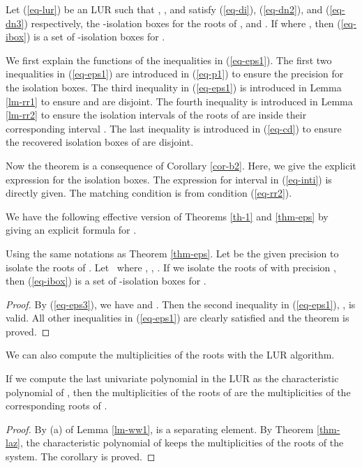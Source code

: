 \documentclass[amsthm]{JSC_LaTex_2007_Mar_12/elsart}
\def\bref#1{(\ref{#1})}
\begin{document}
\begin{thm}\label{thm-eps}
Let \bref{eq-lur} be an LUR such that , , and 
satisfy \bref{eq-di}, \bref{eq-dn2}, and \bref{eq-dn3} respectively,
 the -isolation boxes for the roots of
, and . If
 where ,
 then \bref{eq-ibox} is a set of -isolation boxes  for .
\end{thm}
\begin{pf}
We  first explain the functions of the inequalities in
\bref{eq-eps1}.
The first two inequalities in \bref{eq-eps1} are introduced in
\bref{eq-p1} to ensure the  precision for the isolation
boxes.
The third inequality in \bref{eq-eps1} is introduced in Lemma
\ref{lm-rr1} to ensure  and
 are disjoint.
The fourth inequality is introduced in Lemma \ref{lm-rr2} to ensure
the isolation intervals of the roots of  are inside
their corresponding interval .
The last inequality is introduced in \bref{eq-cd} to ensure the
recovered isolation boxes of  are disjoint.

Now the theorem is a consequence of Corollary \ref{cor-b2}. Here, we
give the explicit expression for the isolation boxes. The expression
for interval  in \bref{eq-inti} is directly given. The
matching condition  is from
condition \bref{eq-rr2}.
\end{pf}

We have the following effective version of Theorems \ref{th-1} and
\ref{thm-eps} by giving an explicit formula for .
\begin{thm} \label{thm-eps1} Using the same notations as Theorem \ref{thm-eps}.
Let  be the given precision to isolate the roots of
.
Let
\
where , , .
If we isolate the roots of  with precision ,
then  \bref{eq-ibox} is a set of -isolation boxes  for
.
\end{thm}
\begin{proof}
By \bref{eq-eps3}, we have
  and
 .
Then the second inequality in \bref{eq-eps1},
, is valid. All
other inequalities in \bref{eq-eps1} are clearly satisfied and the
theorem is proved.
\end{proof}

We can also compute the multiplicities of the roots with the LUR
algorithm.

\begin{cor}
If we compute the last univariate polynomial  in the LUR as
the characteristic polynomial of , then the multiplicities of
the roots of  are the multiplicities of the corresponding
roots of .
\end{cor}
\begin{proof}
By (a) of Lemma \ref{lm-ww1},  is a separating element. By Theorem \ref{thm-laz}, the
characteristic polynomial of  keeps the multiplicities of the
roots of the system. The corollary is proved.
\end{proof}
\end{document}

